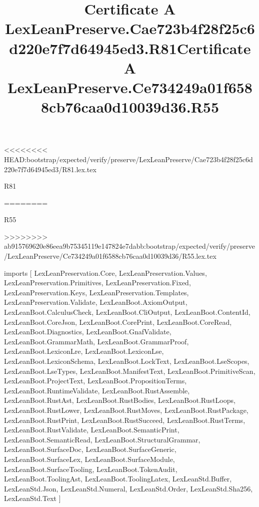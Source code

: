 <<<<<<<< HEAD:bootstrap/expected/verify/preserve/LexLeanPreserve/Cae723b4f28f25c6d220e7f7d64945ed3/R81.lex.tex
\begin{lexlean}{R81}
\title{Certificate A LexLeanPreserve.Cae723b4f28f25c6d220e7f7d64945ed3.R81}
========
\begin{lexlean}{R55}
\title{Certificate A LexLeanPreserve.Ce734249a01f6588cb76caa0d10039d36.R55}
>>>>>>>> ab915769620e86eea9b75345119e147824e7dabb:bootstrap/expected/verify/preserve/LexLeanPreserve/Ce734249a01f6588cb76caa0d10039d36/R55.lex.tex
\begin{coremodule}
imports [
  LexLeanPreservation.Core,
  LexLeanPreservation.Values,
  LexLeanPreservation.Primitives,
  LexLeanPreservation.Fixed,
  LexLeanPreservation.Keys,
  LexLeanPreservation.Templates,
  LexLeanPreservation.Validate,
  LexLeanBoot.AxiomOutput,
  LexLeanBoot.CalculusCheck,
  LexLeanBoot.CliOutput,
  LexLeanBoot.ContentId,
  LexLeanBoot.CoreJson,
  LexLeanBoot.CorePrint,
  LexLeanBoot.CoreRead,
  LexLeanBoot.Diagnostics,
  LexLeanBoot.GnafValidate,
  LexLeanBoot.GrammarMath,
  LexLeanBoot.GrammarProof,
  LexLeanBoot.LexiconLre,
  LexLeanBoot.LexiconLse,
  LexLeanBoot.LexiconSchema,
  LexLeanBoot.LockText,
  LexLeanBoot.LseScopes,
  LexLeanBoot.LseTypes,
  LexLeanBoot.ManifestText,
  LexLeanBoot.PrimitiveScan,
  LexLeanBoot.ProjectText,
  LexLeanBoot.PropositionTerms,
  LexLeanBoot.RuntimeValidate,
  LexLeanBoot.RustAssemble,
  LexLeanBoot.RustAst,
  LexLeanBoot.RustBodies,
  LexLeanBoot.RustLoops,
  LexLeanBoot.RustLower,
  LexLeanBoot.RustMoves,
  LexLeanBoot.RustPackage,
  LexLeanBoot.RustPrint,
  LexLeanBoot.RustSucceed,
  LexLeanBoot.RustTerms,
  LexLeanBoot.RustValidate,
  LexLeanBoot.SemanticPrint,
  LexLeanBoot.SemanticRead,
  LexLeanBoot.StructuralGrammar,
  LexLeanBoot.SurfaceDoc,
  LexLeanBoot.SurfaceGeneric,
  LexLeanBoot.SurfaceLex,
  LexLeanBoot.SurfaceModule,
  LexLeanBoot.SurfaceTooling,
  LexLeanBoot.TokenAudit,
  LexLeanBoot.ToolingAst,
  LexLeanBoot.ToolingLatex,
  LexLeanStd.Buffer,
  LexLeanStd.Json,
  LexLeanStd.Numeral,
  LexLeanStd.Order,
  LexLeanStd.Sha256,
  LexLeanStd.Text
]


\end{coremodule}
\end{lexlean}
\end{lexlean}
